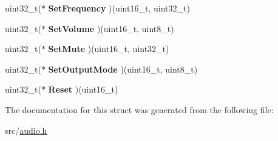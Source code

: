 \begin{DoxyCompactItemize}
\mbox{\label{struct_a_u_d_i_o___drv_type_def_ae5b244722d0f1a115b9a2cc32987779e}} 
uint32\+\_\+t($\ast$ {\bfseries Set\+Frequency} )(uint16\+\_\+t, uint32\+\_\+t)
\item 
\mbox{\label{struct_a_u_d_i_o___drv_type_def_a13b4bc20abd9c52699c671d4cf443328}} 
uint32\+\_\+t($\ast$ {\bfseries Set\+Volume} )(uint16\+\_\+t, uint8\+\_\+t)
\item 
\mbox{\label{struct_a_u_d_i_o___drv_type_def_a1cd7d3e9b13c686c3e4bebe9b6709f23}} 
uint32\+\_\+t($\ast$ {\bfseries Set\+Mute} )(uint16\+\_\+t, uint32\+\_\+t)
\item 
\mbox{\label{struct_a_u_d_i_o___drv_type_def_a8cdc5e3ea9a629ca4b84ecf78aabb633}} 
uint32\+\_\+t($\ast$ {\bfseries Set\+Output\+Mode} )(uint16\+\_\+t, uint8\+\_\+t)
\item 
\mbox{\label{struct_a_u_d_i_o___drv_type_def_ac9d17a087e4a614abd95bf79685d00ba}} 
uint32\+\_\+t($\ast$ {\bfseries Reset} )(uint16\+\_\+t)
\end{DoxyCompactItemize}


The documentation for this struct was generated from the following file\+:\begin{DoxyCompactItemize}
\item 
src/\mbox{\hyperlink{audio_8h}{audio.\+h}}\end{DoxyCompactItemize}
